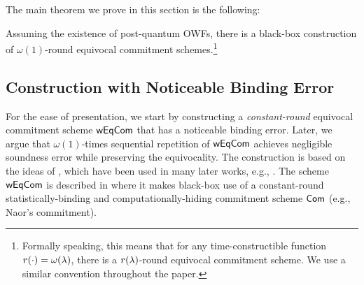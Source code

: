 The main theorem we prove in this section is the following: 
\begin{theorem}\label{thm:eqcom}
Assuming the existence of post-quantum OWFs, there is a black-box construction of $\omega(1)$-round equivocal commitment schemes.\footnote{Formally speaking, this means that for any time-constructible function $r(\cdot)=\omega(\lambda)$, 
there is a $r(\lambda)$-round equivocal commitment scheme. We use a similar convention throughout the paper.}  
\end{theorem}


\subsection{Construction with Noticeable Binding Error}
For the ease of presentation, we start by constructing a \emph{constant-round} equivocal commitment scheme $\mathsf{wEqCom}$ that has a noticeable binding error. 
Later, we argue that $\omega(1)$-times sequential repetition of $\mathsf{wEqCom}$ achieves negligible soundness error while preserving the equivocality. The construction is based on the ideas of \cite{STOC:Kilian88,FOCS:Kilian94}, which have been used in many later works, e.g., \cite{TCC:PasWee09,C:BCKM21b}.  
 The scheme $\mathsf{wEqCom}$ is described in  where it
 makes black-box use of a constant-round statistically-binding and computationally-hiding commitment scheme $\mathsf{Com}$ (e.g., Naor's commitment).  


